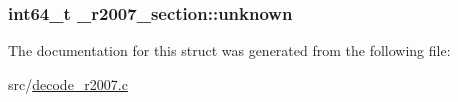\hypertarget{struct__r2007__section_aeac5c2844f6d541dbe1cfd11d905bfc5}{
\subsubsection[{unknown}]{\setlength{\rightskip}{0pt plus 5cm}int64\-\_\-t {\bf \-\_\-r2007\-\_\-section\-::unknown}}}\label{struct__r2007__section_aeac5c2844f6d541dbe1cfd11d905bfc5}


\-The documentation for this struct was generated from the following file\-:\begin{DoxyCompactItemize}
\item 
src/\hyperlink{decode__r2007_8c}{decode\-\_\-r2007.\-c}\end{DoxyCompactItemize}
